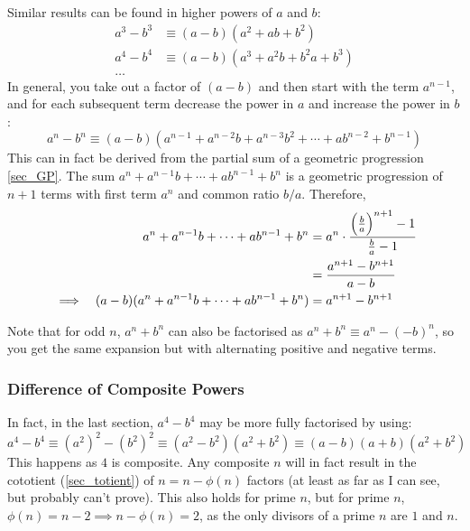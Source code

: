 \documentclass[fleqn,a4paper,11pt]{article}
\begin{document}
    Similar results can be found in higher powers of \(a\) and \(b\):
    \begin{align*}
    a^3 - b^3 &\equiv (a - b)(a^2 + ab + b^2) \\
    a^4 - b^4 &\equiv (a - b)(a^3 + a^2b + b^2a + b^3) \\
    \dots
    \end{align*}
    In general, you take out a factor of \((a - b)\) and then start with the
    term \(a^{n - 1}\), and for each subsequent term decrease the power in \(a\)
    and increase the power in \(b\):
    \begin{equation}
    a^n - b^n \equiv (a - b)(a^{n - 1} + a^{n - 2}b + a^{n - 3}b^2 + \dotsb +
                             ab^{n - 2} + b^{n - 1})
    \end{equation}
    This can in fact be derived from the partial sum of a geometric progression
    \ref{sec_GP}. The sum \(a^n + a^{n - 1}b + \dotsb + ab^{n - 1} + b^n\) is
    a geometric progression of \(n + 1\) terms with first term \(a^n\) and
    common ratio \(b/a\).  Therefore,
    \begin{alignat*}{2}
    &&a^n + a^{n - 1}b + \dotsb + ab^{n - 1} + b^n &=
            a^n \cdot \frac{\pqty{\frac ba}^{n + 1} - 1}{\frac ba - 1} \\
    &&    &= \frac{a^{n + 1} - b^{n + 1}}{a - b} \\
    &\implies& (a - b)(a^n + a^{n - 1}b + \dotsb + ab^{n - 1} + b^n) &=
            a^{n + 1} - b^{n + 1}
    \end{alignat*}

    Note that for odd \(n\), \(a^n + b^n\) can also be factorised as
    \(a^n + b^n \equiv a^n - (-b)^n\), so you get the same expansion but with
    alternating positive and negative terms.


    \subsubsection{Difference of Composite Powers}

    In fact, in the last section, \(a^4 - b^4\) may be more fully factorised by
    using:
    \begin{equation*}
    a^4 - b^4 \equiv (a^2)^2 - (b^2)^2 \equiv (a^2 - b^2)(a^2 + b^2) \equiv
        (a - b)(a + b)(a^2 + b^2)
    \end{equation*}
    This happens as \(4\) is composite. Any composite \(n\) will in fact result
    in the cototient (\ref{sec_totient}) of \(n = n - \phi(n)\) factors (at
    least as far as I can see, but probably can't prove). This
    also holds for prime \(n\), but for prime \(n\),
    \(\phi(n) = n - 2 \implies n - \phi(n) = 2\), as the only divisors of
    a prime \(n\) are \(1\) and \(n\).
\end{document}
